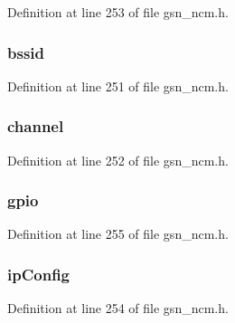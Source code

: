 Definition at line 253 of file gsn\_\-ncm.h.

\hypertarget{a00156_ad8607c5127fe55daa3cb20175af535c6}{
\subsubsection[{bssid}]{ {\bf bssid}}}
\label{a00156_ad8607c5127fe55daa3cb20175af535c6}


Definition at line 251 of file gsn\_\-ncm.h.

\hypertarget{a00156_a52d69a3bd7bdfdfc6f9e40f4962c575d}{
\subsubsection[{channel}]{ {\bf channel}}}
\label{a00156_a52d69a3bd7bdfdfc6f9e40f4962c575d}


Definition at line 252 of file gsn\_\-ncm.h.

\hypertarget{a00156_a458bbee8aed8c92436e82f0d7a969f6a}{
\subsubsection[{gpio}]{ {\bf gpio}}}
\label{a00156_a458bbee8aed8c92436e82f0d7a969f6a}


Definition at line 255 of file gsn\_\-ncm.h.

\hypertarget{a00156_a1dede6b9b16f28827ae79e82aba27440}{
\subsubsection[{ipConfig}]{ {\bf ipConfig}}}
\label{a00156_a1dede6b9b16f28827ae79e82aba27440}


Definition at line 254 of file gsn\_\-ncm.h.

